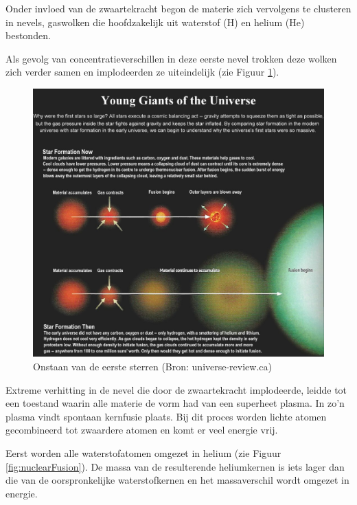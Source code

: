 \documentclass[
  11pt,
]{book}
\begin{document}
Onder invloed van de zwaartekracht begon de materie zich vervolgens te clusteren in nevels, gaswolken die hoofdzakelijk uit waterstof (H) en helium (He) bestonden.

Als gevolg van concentratieverschillen in deze eerste nevel trokken deze wolken zich verder samen en implodeerden ze uiteindelijk (zie Figuur \ref{fig:genesisStar}).

\begin{figure}

{\centering \includegraphics[width=1\linewidth]{./figs/I08-13-firststars6} 

}

\caption{Onstaan van de eerste sterren (Bron: universe-review.ca)}\label{fig:genesisStar}
\end{figure}

Extreme verhitting in de nevel die door de zwaartekracht implodeerde, leidde tot een toestand waarin alle materie de vorm had van een superheet plasma. In zo'n plasma vindt spontaan kernfusie plaats. Bij dit proces worden lichte atomen gecombineerd tot zwaardere atomen en komt er veel energie vrij.

Eerst worden alle waterstofatomen omgezet in helium (zie Figuur \ref{fig:nuclearFusion}). De massa van de resulterende heliumkernen is iets lager dan die van de oorspronkelijke waterstofkernen en het massaverschil wordt omgezet in energie.
\end{document}
